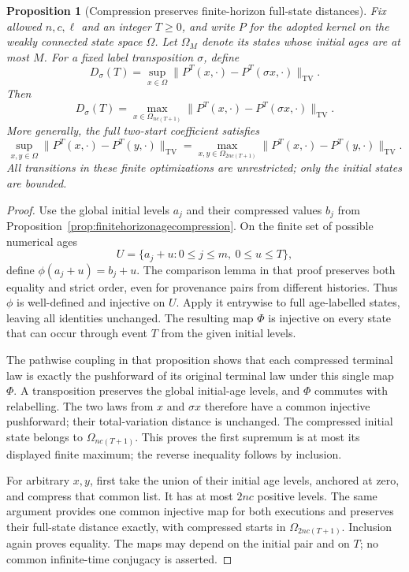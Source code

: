 \documentclass[11pt]{article}
\newtheorem{proposition}[theorem]{Proposition}
\newcommand{\TV}{\mathrm{TV}}
\begin{document}
\begin{proposition}[Compression preserves finite-horizon full-state distances]
\label{prop:finitehorizonfulltv}
Fix allowed $n,c,\ell$ and an integer $T\ge0$, and write $P$
for the adopted kernel on the weakly connected state space
$\Omega$. Let $\Omega_M$ denote its states whose initial ages
are at most $M$. For a fixed label transposition $\sigma$, define
\[
 D_\sigma(T)=\sup_{x\in\Omega}
       \|P^T(x,\cdot)-P^T(\sigma x,\cdot)\|_{\TV}.
\]
Then
\[
 D_\sigma(T)=\max_{x\in\Omega_{nc(T+1)}}
       \|P^T(x,\cdot)-P^T(\sigma x,\cdot)\|_{\TV}.
\]
More generally, the full two-start coefficient satisfies
\[
 \sup_{x,y\in\Omega}\|P^T(x,\cdot)-P^T(y,\cdot)\|_{\TV}
 =\max_{x,y\in\Omega_{2nc(T+1)}}
       \|P^T(x,\cdot)-P^T(y,\cdot)\|_{\TV}.
\]
All transitions in these finite optimizations are unrestricted;
only the initial states are bounded.
\end{proposition}
\begin{proof}
Use the global initial levels $a_j$ and their compressed values
$b_j$ from Proposition~\ref{prop:finitehorizonagecompression}.
On the finite set of possible numerical ages
\[
 U=\{a_j+u:0\le j\le m,\ 0\le u\le T\},
\]
define $\phi(a_j+u)=b_j+u$. The comparison lemma in that
proof preserves both equality and strict order, even for
provenance pairs from different histories. Thus $\phi$ is
well-defined and injective on $U$. Apply it entrywise to
full age-labelled states, leaving all identities unchanged.
The resulting map $\Phi$ is injective on every state that
can occur through event $T$ from the given initial levels.

The pathwise coupling in that proposition shows that each
compressed terminal law is exactly the pushforward of its
original terminal law under this single map $\Phi$. A
transposition preserves the global initial-age levels, and
$\Phi$ commutes with relabelling. The two laws from $x$ and
$\sigma x$ therefore have a common injective pushforward;
their total-variation distance is unchanged. The compressed
initial state belongs to $\Omega_{nc(T+1)}$. This proves
the first supremum is at most its displayed finite maximum;
the reverse inequality follows by inclusion.

For arbitrary $x,y$, first take the union of their initial
age levels, anchored at zero, and compress that common list.
It has at most $2nc$ positive levels. The same argument
provides one common injective map for both executions and
preserves their full-state distance exactly, with compressed
starts in $\Omega_{2nc(T+1)}$. Inclusion again proves equality.
The maps may depend on the initial pair and on $T$; no common
infinite-time conjugacy is asserted.
\end{proof}
\end{document}
